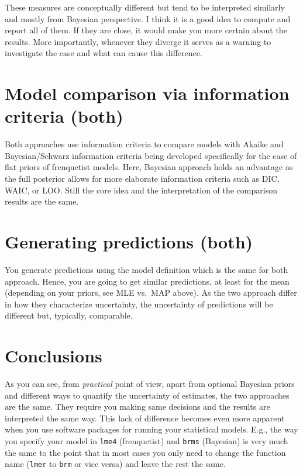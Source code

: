 \documentclass[
]{book}
\begin{document}
These measures are conceptually different but tend to be interpreted similarly and mostly from Bayesian perspective. I think it is a good idea to compute and report all of them. If they are close, it would make you more certain about the results. More importantly, whenever they diverge it serves as a warning to investigate the case and what can cause this difference.

\hypertarget{model-comparison-via-information-criteria-both}{%
\section{Model comparison via information criteria (both)}\label{model-comparison-via-information-criteria-both}}

Both approaches use information criteria to compare models with Akaike and Bayesian/Schwarz information criteria being developed specifically for the case of flat priors of frenquetist models. Here, Bayesian approach holds an advantage as the full posterior allows for more elaborate information criteria such as DIC, WAIC, or LOO. Still the core idea and the interpretation of the comparison results are the same.

\hypertarget{generating-predictions-both}{%
\section{Generating predictions (both)}\label{generating-predictions-both}}

You generate predictions using the model definition which is the same for both approach. Hence, you are going to get similar predictions, at least for the mean (depending on your priors, see MLE vs.~MAP above). As the two approach differ in how they characterize uncertainty, the uncertainty of predictions will be different but, typically, comparable.

\hypertarget{conclusions}{%
\section{Conclusions}\label{conclusions}}

As you can see, from \emph{practical} point of view, apart from optional Bayesian priors and different ways to quantify the uncertainty of estimates, the two approaches are the same. They require you making same decisions and the results are interpreted the same way. This lack of difference becomes even more apparent when you use software packages for running your statistical models. E.g., the way you specify your model in \texttt{lme4} (frenquetist) and \texttt{brms} (Bayesian) is very much the same to the point that in most cases you only need to change the function name (\texttt{lmer} to \texttt{brm} or vice versa) and leave the rest the same.
\end{document}
